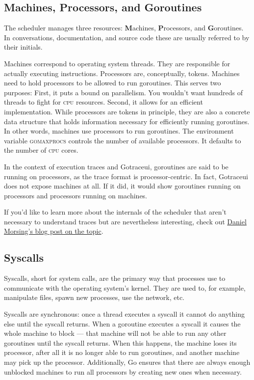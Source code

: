 \documentclass[10pt,letterpaper,oneside,openany,english]{memoir}
\newcommand{\code}[1]{{\ttfamily\mbox{#1}}}
\begin{document}
\subsection{Machines, Processors, and Goroutines}

The scheduler manages three resources: \textbf{M}achines, \textbf{P}rocessors, and \textbf{G}oroutines.
In conversations, documentation, and source code these are usually referred to by their initials.

Machines correspond to operating system threads.
They are responsible for actually executing instructions.
Processors are, conceptually, tokens.
Machines need to hold processors to be allowed to run goroutines.
This serves two purposes:
First, it puts a bound on parallelism.
You wouldn't want hundreds of threads to fight for \textsc{cpu} resources.
Second, it allows for an efficient implementation.
While processors are tokens in principle, they are also a concrete data structure that holds information necessary for efficiently running goroutines.
In other words, machines use processors to run goroutines.
The environment variable \code{\textsc{gomaxprocs}} controls the number of available processors.
It defaults to the number of \textsc{cpu} cores.

In the context of execution traces and Gotraceui, goroutines are said to be running on processors, as the trace format is processor-centric.
In fact, Gotraceui does not expose machines at all.
If it did, it would show goroutines running on processors and processors running on machines.

If you'd like to learn more about the internals of the scheduler that aren't necessary to understand traces but are nevertheless interesting, check out \href{https://morsmachine.dk/go-scheduler}{Daniel Morsing's blog post on the topic}.\cite{morsingGoScheduler2013}

\subsection{Syscalls}\label{syscalls}
Syscalls, short for system calls, are the primary way that processes use to communicate with the operating system's kernel.
They are used to, for example, manipulate files, spawn new processes, use the network, etc.

Syscalls are synchronous: once a thread executes a syscall it cannot do anything else until the syscall returns.
When a goroutine executes a syscall it causes the whole machine to block --- that machine will not be able to run any other goroutines until the syscall returns.
When this happens, the machine loses its processor, after all it is no longer able to run goroutines, and another machine may pick up the processor.
Additionally, Go ensures that there are always enough unblocked machines to run all processors by creating new ones when necessary.
\end{document}
